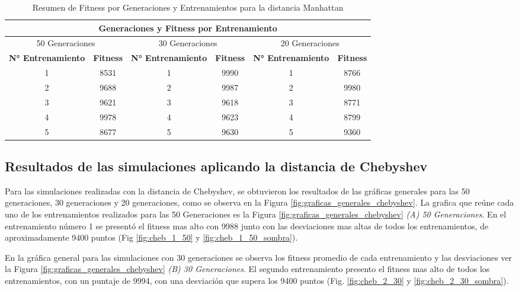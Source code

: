 \documentclass[conference]{IEEEtran}
\begin{document}
\begin{table}[ht]
    \centering
    \caption{Resumen de Fitness por Generaciones y Entrenamientos para la distancia Manhattan}
    \label{tab:fitness_generaciones_manhattan}
    \begin{tabular}{cccccc}
        \toprule
        \multicolumn{6}{c}{Generaciones y Fitness por Entrenamiento} \\
        \midrule
        \multicolumn{2}{c}{50 Generaciones} & \multicolumn{2}{c}{30 Generaciones} & \multicolumn{2}{c}{20 Generaciones} \\
        \cmidrule(lr){1-2} \cmidrule(lr){3-4} \cmidrule(lr){5-6}
        \textbf{N° Entrenamiento} & \textbf{Fitness} & \textbf{N° Entrenamiento} & \textbf{Fitness} & \textbf{N° Entrenamiento} & \textbf{Fitness} \\
        \midrule
        1 & 8531 & 1 & 9990 & 1 & 8766 \\
        2 & 9688 & 2 & 9987 & 2 & 9980 \\
        3 & 9621 & 3 & 9618 & 3 & 8771 \\
        4 & 9978 & 4 & 9623 & 4 & 8799 \\
        5 & 8677 & 5 & 9630 & 5 & 9360 \\
        \bottomrule
    \end{tabular}
\end{table}


\subsection{Resultados de las simulaciones aplicando la distancia de Chebyshev}
Para las simulaciones realizadas con la distancia de Chebyshev, se obtuvieron los resultados de las gráficas generales para las 50 generaciones, 30 generaciones y 20 generaciones, como se observa en la Figura \ref{fig:graficas_generales_chebyshev}.
La grafica que reúne cada uno de los entrenamientos realizados para las 50 Generaciones es la Figura \ref{fig:graficas_generales_chebyshev} \textit{(A) 50 Generaciones}.
En el entrenamiento número 1 se presentó el fitness mas alto con 9988 junto con las desviaciones mas altas de todos los entrenamientos, de aproximadamente 9400 puntos (Fig \ref{fig:cheb_1_50} y \ref{fig:cheb_1_50_sombra}).

En la gráfica general para las simulaciones con 30 generaciones se observa los fitness promedio de cada entrenamiento y las desviaciones ver la Figura \ref{fig:graficas_generales_chebyshev} \textit{(B) 30 Generaciones}.
El segundo entrenamiento presento el fitness mas alto de todos los entrenamientos, con un puntaje de 9994, con una desviación que supera los 9400 puntos (Fig. \ref{fig:cheb_2_30} y \ref{fig:cheb_2_30_sombra}).
\end{document}
